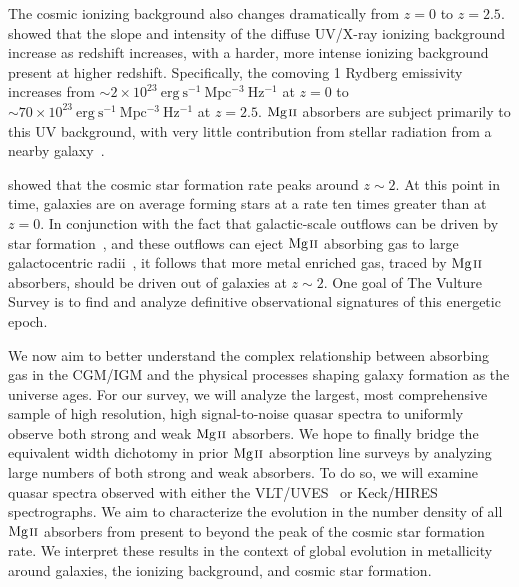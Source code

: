 \documentclass[iop,apj,numberedappendix,appendixfloats,twocolappendix]{emulateapj}
\begin{document}

The cosmic ionizing background also changes dramatically from $z = 0$ to $z = 2.5$. \cite{Haardt2012} showed that the slope and intensity of the diffuse UV/X-ray ionizing background increase as redshift increases, with a harder, more intense ionizing background present at higher redshift. Specifically, the comoving 1 Rydberg emissivity increases from $\sim2 \times 10^{23}~\mathrm{erg~s^{-1}~Mpc^{-3}~Hz^{-1}}$ at $z = 0$ to $\sim70 \times 10^{23}~\mathrm{erg~s^{-1}~Mpc^{-3}~Hz^{-1}}$ at $z = 2.5$. ${\hbox{{\rm Mg}\kern 0.1em{\sc ii}}}$ absorbers are subject primarily to this UV background, with very little contribution from stellar radiation from a nearby galaxy~\citep{Churchill1999,Charlton2000,Rigby2002}.

\cite{Behroozi2013sfr} showed that the cosmic star formation rate peaks around $z \sim 2$. At this point in time, galaxies are on average forming stars at a rate ten times greater than at $z = 0$. In conjunction with the fact that galactic-scale outflows can be driven by star formation~\citep{Zhu2015}, and these outflows can eject ${\hbox{{\rm Mg}\kern 0.1em{\sc ii}}}$ absorbing gas to large galactocentric radii~\citep{Sharma2013,Kacprzak2012-PA,Nestor2011}, it follows that more metal enriched gas, traced by ${\hbox{{\rm Mg}\kern 0.1em{\sc ii}}}$ absorbers, should be driven out of galaxies at $z \sim 2$. One goal of The Vulture Survey is to find and analyze definitive observational signatures of this energetic epoch. 

We now aim to better understand the complex relationship between absorbing gas in the CGM/IGM and the physical processes shaping galaxy formation as the universe ages. For our survey, we will analyze the largest, most comprehensive sample of high resolution, high signal-to-noise quasar spectra to uniformly observe both strong and weak ${\hbox{{\rm Mg}\kern 0.1em{\sc ii}}}$ absorbers. We hope to finally bridge the equivalent width dichotomy in prior ${\hbox{{\rm Mg}\kern 0.1em{\sc ii}}}$ absorption line surveys by analyzing large numbers of both strong and weak absorbers. To do so, we will examine quasar spectra observed with either the VLT/UVES~\citep{Dekker2000} or Keck/HIRES~\citep{Vogt1994} spectrographs. We aim to characterize the evolution in the number density of all ${\hbox{{\rm Mg}\kern 0.1em{\sc ii}}}$ absorbers from present to beyond the peak of the cosmic star formation rate. We interpret these results in the context of global evolution in metallicity around galaxies, the ionizing background, and cosmic star formation.
\end{document}
